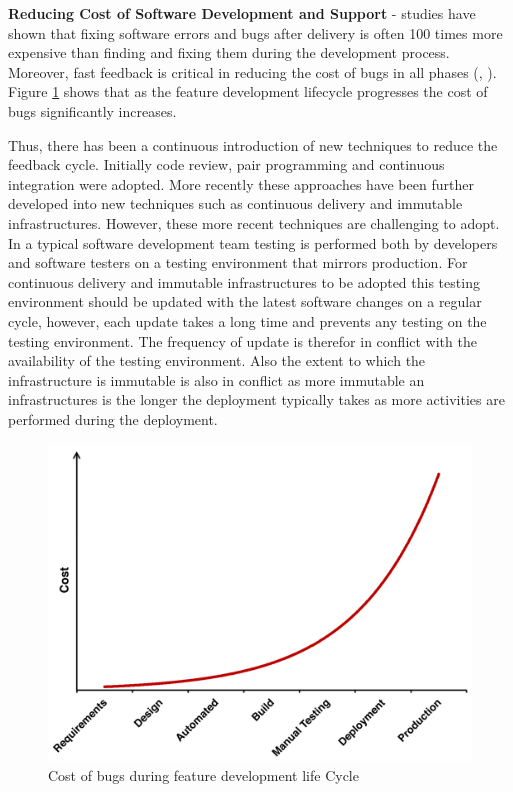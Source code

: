 \documentclass[a4paper,11pt,twoside]{report}
\begin{document}
\noindent \textbf{Reducing Cost of Software Development and Support} - studies have shown that fixing software errors and bugs after delivery is often 100 times more expensive than finding and fixing them during the development process. Moreover, fast feedback is critical in reducing the cost of bugs in all phases (\cite{Boehm_a}, \cite{Boehm_b}). Figure \ref{cost} shows that as the feature development lifecycle progresses the cost of bugs significantly increases. 


Thus, there has been a continuous introduction of new techniques to reduce the feedback cycle.  Initially code review, pair programming and continuous integration were adopted.  More recently these approaches have been further developed into new techniques such as continuous delivery and immutable infrastructures.  However, these more recent techniques are challenging to adopt.  In a typical software development team testing is performed both by developers and software testers on a testing environment that mirrors production.  For continuous delivery and immutable infrastructures to be adopted this testing environment should be updated with the latest software changes on a regular cycle, however, each update takes a long time and prevents any testing on the testing environment.  The frequency of update is therefor in conflict with the availability of the testing environment.  Also the extent to which the infrastructure is immutable is also in conflict as more immutable an infrastructures is the longer the deployment typically takes as more activities are performed during the deployment. 

\begin{figure}[!ht]
  \centering
     \includegraphics[scale=0.25]{cost_of_bugs}
  \caption{Cost of bugs during  feature development life Cycle}
  \label{cost}
\end{figure}
\end{document}
